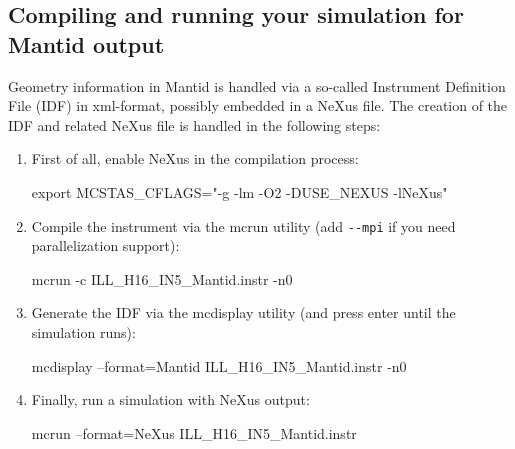 \subsection{Compiling and running your simulation for Mantid output}
Geometry information in Mantid is handled via a so-called Instrument
Definition File (IDF) in xml-format, possibly embedded in a NeXus
file. The creation of the IDF and related NeXus file is handled in the
following steps:
\begin{enumerate}
\item First of all, enable NeXus in the compilation process:
 \begin{mcstas} 
   export MCSTAS_CFLAGS="-g -lm -O2 -DUSE_NEXUS -lNeXus"
 \end{mcstas}
\item Compile the instrument via the mcrun utility (add \verb+--mpi+
  if you need parallelization support):
 \begin{mcstas} 
   mcrun -c ILL_H16_IN5_Mantid.instr -n0
 \end{mcstas}
\item Generate the IDF via the mcdisplay utility (and press enter
  until the simulation runs):
 \begin{mcstas} 
   mcdisplay --format=Mantid ILL_H16_IN5_Mantid.instr -n0
 \end{mcstas}
\item Finally, run a simulation with NeXus output:
 \begin{mcstas} 
   mcrun --format=NeXus ILL_H16_IN5_Mantid.instr 
 \end{mcstas} 
\end{enumerate}


